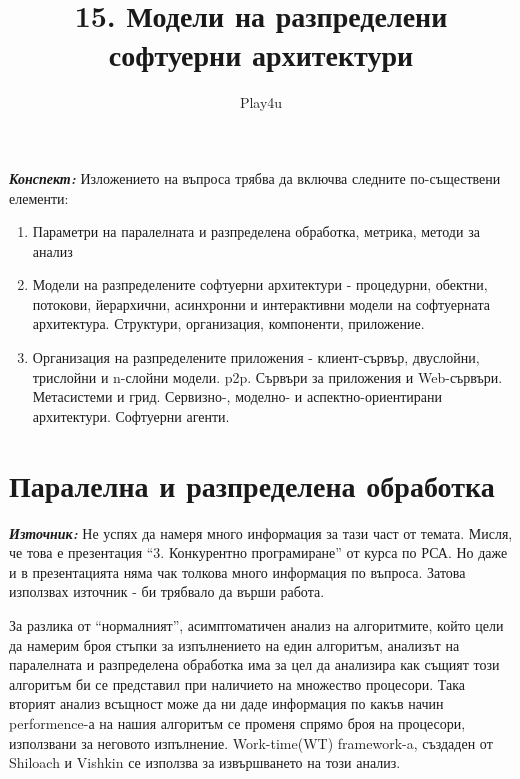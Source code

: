 \documentclass[11pt]{article} %
\title{15. Модели на разпределени софтуерни архитектури}
\author{Play4u}
\newcommand{\italicBold}[1]{\textbf{\emph{#1}}}
\newcommand{\source}{\italicBold{Източник: }}
\newcommand{\enumNum}{\renewcommand{\theenumi}{\arabic{enumi}}}
\begin{document}
\maketitle

\italicBold{Конспект: } Изложението на въпроса трябва да включва следните по-съществени елементи:

\enumNum
\begin{enumerate}[noitemsep]
	\item Параметри на паралелната и разпределена обработка, метрика, методи за анализ
	\item Модели на разпределените софтуерни архитектури - процедурни, обектни, потокови, йерархични, асинхронни и интерактивни модели на софтуерната архитектура. Структури, организация, компоненти, приложение.
	\item Организация на разпределените приложения - клиент-сървър, двуслойни, трислойни и n-слойни модели. p2p. Сървъри за приложения и Web-сървъри. Метасистеми и грид. Сервизно-, моделно- и аспектно-ориентирани архитектури. Софтуерни агенти.
\end{enumerate}


\section{Паралелна и разпределена обработка}
\source Не успях да намеря много информация за тази част от темата. Мисля, че това е презентация \enquote{3. Конкурентно програмиране} от курса по РСА. Но даже и в презентацията няма чак толкова много информация по въпроса. Затова използвах източник  - би трябвало да върши работа.\\\par

За разлика от \enquote{нормалният}, асимптоматичен анализ на алгоритмите, който цели да намерим броя стъпки за изпълнението на един алгоритъм, анализът на паралелната и разпределена обработка има за цел да анализира как същият този алгоритъм би се представил при наличието на множество процесори. Така вторият анализ всъщност може да ни даде информация по какъв начин performence-а на нашия алгоритъм се променя спрямо броя на процесори, използвани за неговото изпълнение. Work-time(WT) framework-a, създаден от Shiloach и Vishkin се използва за извършването на този анализ.\\\par
\end{document}
